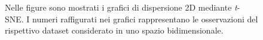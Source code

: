 \documentclass[12pt,italian]{report}
\begin{document}
\begin{figure}
	\centering
	\caption{Nelle figure sono mostrati i grafici di dispersione 2D mediante \emph{t}-SNE. I numeri raffigurati nei grafici rappresentano le osservazioni del rispettivo dataset considerato in uno spazio bidimensionale.}
	\label{fig:tsne_2d}
\end{figure}
\end{document}
